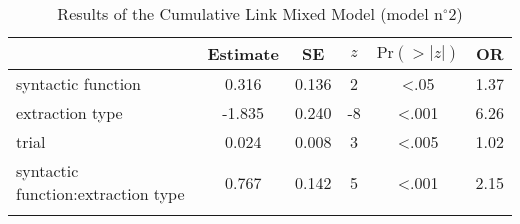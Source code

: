 \begin{table}[ht]
\centering
\begin{tabular}{l S[table-format=-1.3] S[table-format=1.3] S[table-format=-1.0] S[table-format=<1.3] S[table-format=1.2]}
  \lsptoprule
 & {Estimate} & {SE} & {$z$} & {$\text{Pr}(>|z|)$} & {OR} \\ 
  \midrule
  syntactic function                 & 0.316 & 0.136 & 2   & <.05 & 1.37 \\ 
  extraction type                    & -1.835 & 0.240 & -8 & <.001 & 6.26 \\ 
  trial                              & 0.024 & 0.008 & 3   & <.005 & 1.02 \\ 
  syntactic function:extraction type & 0.767 & 0.142 & 5   & <.001 & 2.15 \\ 
   \lspbottomrule
\end{tabular}
\caption{Results of the Cumulative Link Mixed Model (model n$^{\circ}$2)}
\label{tab:exp10-m2}
\end{table}
